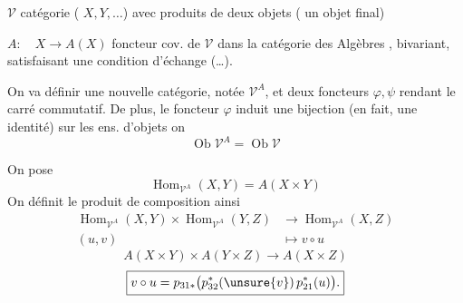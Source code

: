 $\mathcal V$ catégorie ( $X,Y,\ldots$) avec produits de deux objets
( un objet final)

$A:\quad X\longrightarrow A(X)$ foncteur cov. de $\mathcal V$ dans la catégorie
 des Algèbres , bivariant, satisfaisant une condition d'échange
 
(\ldots).

On va définir une nouvelle catégorie, notée $\mathcal V^A$, et
deux foncteurs $\varphi,\psi$
rendant le carré commutatif. De plus,
le foncteur $\varphi$ induit une bijection (en fait,
une identité) sur les ens. d'objets on 
\[
\operatorname{Ob}\mathcal V^A=\operatorname{Ob}\mathcal V
\]

On pose
\[
\operatorname{Hom}_{\mathcal V^A}(X,Y)=A(X\times Y)
\]
On définit le produit de composition ainsi
\[
\begin{aligned}
\operatorname{Hom}_{\mathcal V^A}(X,Y)\times\operatorname{Hom}_{\mathcal V^A}(Y,Z)&\longrightarrow\operatorname{Hom}_{\mathcal V^A}(X,Z)\\
(u,v)&\longmapsto v\circ u
\end{aligned}
\]
\[
A(X\times Y)\times A(Y\times Z)\longrightarrow A(X\times Z)
\]
\[
\boxed{v\circ u=p_{31*}\bigl(p_{32}^*(\unsure{v})\,p_{21}^*(u)\bigr).}
\]
